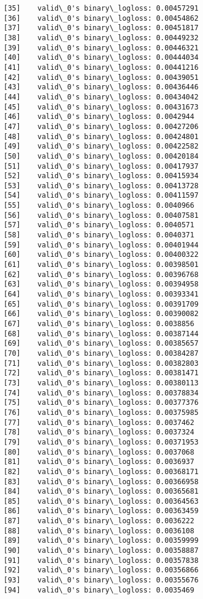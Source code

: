 \documentclass[11pt]{article}
\begin{document}
\begin{Verbatim}[commandchars=\\\{\}]
[35]	valid\_0's binary\_logloss: 0.00457291
[36]	valid\_0's binary\_logloss: 0.00454862
[37]	valid\_0's binary\_logloss: 0.00451817
[38]	valid\_0's binary\_logloss: 0.00449232
[39]	valid\_0's binary\_logloss: 0.00446321
[40]	valid\_0's binary\_logloss: 0.00444034
[41]	valid\_0's binary\_logloss: 0.00441216
[42]	valid\_0's binary\_logloss: 0.00439051
[43]	valid\_0's binary\_logloss: 0.00436446
[44]	valid\_0's binary\_logloss: 0.00434042
[45]	valid\_0's binary\_logloss: 0.00431673
[46]	valid\_0's binary\_logloss: 0.0042944
[47]	valid\_0's binary\_logloss: 0.00427206
[48]	valid\_0's binary\_logloss: 0.00424801
[49]	valid\_0's binary\_logloss: 0.00422582
[50]	valid\_0's binary\_logloss: 0.00420184
[51]	valid\_0's binary\_logloss: 0.00417937
[52]	valid\_0's binary\_logloss: 0.00415934
[53]	valid\_0's binary\_logloss: 0.00413728
[54]	valid\_0's binary\_logloss: 0.00411597
[55]	valid\_0's binary\_logloss: 0.0040966
[56]	valid\_0's binary\_logloss: 0.00407581
[57]	valid\_0's binary\_logloss: 0.0040571
[58]	valid\_0's binary\_logloss: 0.0040371
[59]	valid\_0's binary\_logloss: 0.00401944
[60]	valid\_0's binary\_logloss: 0.00400322
[61]	valid\_0's binary\_logloss: 0.00398501
[62]	valid\_0's binary\_logloss: 0.00396768
[63]	valid\_0's binary\_logloss: 0.00394958
[64]	valid\_0's binary\_logloss: 0.00393341
[65]	valid\_0's binary\_logloss: 0.00391709
[66]	valid\_0's binary\_logloss: 0.00390082
[67]	valid\_0's binary\_logloss: 0.0038856
[68]	valid\_0's binary\_logloss: 0.00387144
[69]	valid\_0's binary\_logloss: 0.00385657
[70]	valid\_0's binary\_logloss: 0.00384287
[71]	valid\_0's binary\_logloss: 0.00382803
[72]	valid\_0's binary\_logloss: 0.00381471
[73]	valid\_0's binary\_logloss: 0.00380113
[74]	valid\_0's binary\_logloss: 0.00378834
[75]	valid\_0's binary\_logloss: 0.00377376
[76]	valid\_0's binary\_logloss: 0.00375985
[77]	valid\_0's binary\_logloss: 0.0037462
[78]	valid\_0's binary\_logloss: 0.0037324
[79]	valid\_0's binary\_logloss: 0.00371953
[80]	valid\_0's binary\_logloss: 0.0037068
[81]	valid\_0's binary\_logloss: 0.0036937
[82]	valid\_0's binary\_logloss: 0.00368171
[83]	valid\_0's binary\_logloss: 0.00366958
[84]	valid\_0's binary\_logloss: 0.00365681
[85]	valid\_0's binary\_logloss: 0.00364563
[86]	valid\_0's binary\_logloss: 0.00363459
[87]	valid\_0's binary\_logloss: 0.0036222
[88]	valid\_0's binary\_logloss: 0.0036108
[89]	valid\_0's binary\_logloss: 0.00359999
[90]	valid\_0's binary\_logloss: 0.00358887
[91]	valid\_0's binary\_logloss: 0.00357838
[92]	valid\_0's binary\_logloss: 0.00356866
[93]	valid\_0's binary\_logloss: 0.00355676
[94]	valid\_0's binary\_logloss: 0.0035469

\end{Verbatim}
\end{document}
